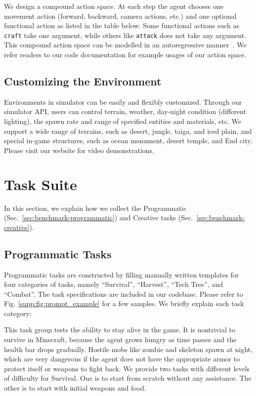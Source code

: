 We design a compound action space. At each step the agent chooses one movement action (forward, backward, camera actions, etc.) and one optional functional action as listed in the table below. Some functional actions such as \texttt{craft} take one argument, while others like \texttt{attack} does not take any argument. This compound action space can be modelled in an autoregressive manner~\cite{vinyals2019alphastar}. We refer readers to our code documentation for example usages of our action space.



\subsection{Customizing the Environment}
Environments in \mineclip simulator can be easily and flexibly customized. Through our simulator API, users can control terrain, weather, day-night condition (different lighting), the spawn rate and range of specified entities and materials, etc. We support a wide range of terrains, such as desert, jungle, taiga, and iced plain, and special in-game structures, such as ocean monument, desert temple, and End city.
Please visit our website for video demonstrations.



\section{\minedojo Task Suite}
\label{supp:sec:task_suite}

In this section, we explain how we collect the Programmatic (Sec.~\ref{sec:benchmark-programmatic}) and Creative tasks (Sec.~\ref{sec:benchmark-creative}). 



\subsection{Programmatic Tasks}
Programmatic tasks are constructed by filling manually written templates for four categories of tasks, namely ``Survival'', ``Harvest'', ``Tech Tree'', and ``Combat''. The task specifications are included in our codebase. Please refer to Fig. \ref{supp:fig:prompt_example} for a few samples.
We briefly explain each task category: 

This task group tests the ability to stay alive in the game. It is nontrivial to survive in Minecraft, because the agent grows hungry as time passes and the health bar drops gradually. Hostile mobs like zombie and skeleton spawn at night, which are very dangerous if the agent does not have the appropriate armor to protect itself or weapons to fight back. We provide two tasks with different levels of difficulty for Survival. One is to start from scratch without any assistance. The other is to start with initial weapons and food. 

